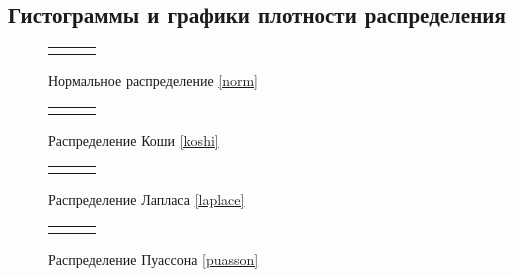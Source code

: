 \documentclass[a4paper]{article}
\begin{document}
\subsection{Гистограммы и графики плотности распределения}
	\begin{figure}[H]
		\centering
		\begin{tabular}{ccc}
			&
			&
		\end{tabular}
		\caption{Нормальное распределение \eqref{norm}} 
		\label{fig:normal}
	\end{figure}

	\begin{figure}[H]
		\centering
		\begin{tabular}{ccc}
			&
			&
		\end{tabular}
		\caption{Распределение Коши \eqref{koshi}}
		\label{fig:cauchy}
	\end{figure}
	

	\begin{figure}[H]
		\centering
		\begin{tabular}{ccc}
			&
			&
		\end{tabular}
		\caption{Распределение Лапласа \eqref{laplace}}
		\label{fig:laplace}
	\end{figure}


	\begin{figure}[H]
		\centering
		\begin{tabular}{ccc}
			&
			&
		\end{tabular}
		\caption{Распределение Пуассона \eqref{puasson}}
		\label{fig:poisson}
	\end{figure}
\end{document}
